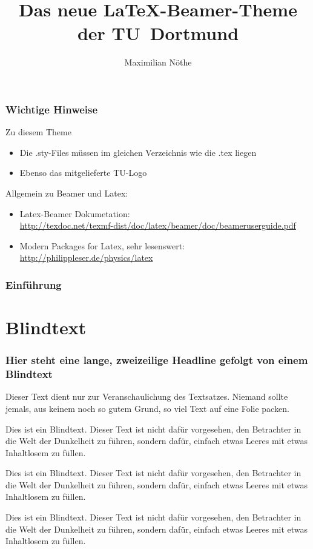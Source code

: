 \documentclass[9pt]{beamer}
\title{Das neue \LaTeX-Beamer-Theme der \mbox{TU Dortmund}}
\author{Maximilian Nöthe}
\institute[Lehrstuhl\\Fakultät]{Names des Lehrstuhls /\par\smallskip\smallskip Name der Fakultät}
\begin{document}
\begin{frame}
\setcounter{framenumber}{0}
    \titlepage
\end{frame}

\begin{frame}
    \frametitle{Wichtige Hinweise}
    Zu diesem Theme
    \begin{itemize}
        \item Die .sty-Files müssen im gleichen Verzeichnis wie die .tex liegen
        \item Ebenso das mitgelieferte TU-Logo
    \end{itemize}
    Allgemein zu Beamer und Latex:
    \begin{itemize}
        \item Latex-Beamer Dokumetation:\\
            \url{http://texdoc.net/texmf-dist/doc/latex/beamer/doc/beameruserguide.pdf}
        \item Modern Packages for Latex, sehr lesenswert:
            \url{http://philippleser.de/physics/latex}
    \end{itemize}
\end{frame}

\begin{frame}
    \frametitle{Einführung}
    \tableofcontents[pausesections]
\end{frame}

\section{Blindtext}
\begin{frame}
	\frametitle{Hier steht eine lange, zweizeilige Headline
		\newline gefolgt von einem Blindtext}
Dieser Text dient nur zur Veranschaulichung des Textsatzes. Niemand sollte jemals, aus keinem noch so gutem Grund, so viel Text auf eine Folie packen.

Dies ist ein Blindtext. Dieser Text ist nicht dafür vorgesehen, den Betrachter in die Welt der Dunkelheit zu führen, sondern dafür, einfach etwas Leeres mit etwas Inhaltlosem zu füllen.

Dies ist ein Blindtext. Dieser Text ist nicht dafür vorgesehen, den Betrachter in die Welt der Dunkelheit zu führen, sondern dafür, einfach etwas Leeres mit etwas Inhaltlosem zu füllen.

Dies ist ein Blindtext. Dieser Text ist nicht dafür vorgesehen, den Betrachter in die Welt der Dunkelheit zu führen, sondern dafür, einfach etwas Leeres mit etwas Inhaltlosem zu füllen.

\end{frame}
\end{document}
